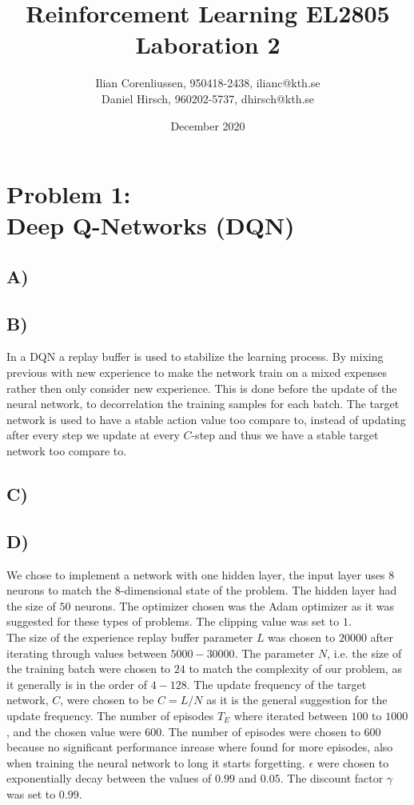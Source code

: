 \documentclass{article}
\title{Reinforcement Learning EL2805\\
       Laboration 2}
\author{Ilian Corenliussen, 950418-2438, ilianc@kth.se\\ 
        Daniel Hirsch, 960202-5737, dhirsch@kth.se}
\date{December 2020}
\begin{document}
\maketitle

\section*{Problem 1: \\
        Deep Q-Networks (DQN)}
\subsection*{A)}

\subsection*{B)} In a DQN a replay buffer is used to stabilize the learning process. By mixing previous with new experience to make the network train on a mixed expenses rather then only consider new experience. This is done before the update of the neural network, to decorrelation the training samples for each batch. The target network is used to have a stable action value too compare to, instead of updating after every step we update at every $C$-step and thus we have a stable target network too compare to.
\subsection*{C)}

\subsection*{D)}
We chose to implement a network with one hidden layer, the input layer uses $8$ neurons to match the 8-dimensional state of the problem. The hidden layer had the size of $50$ neurons. The optimizer chosen was the Adam optimizer as it was suggested for these types of problems. The clipping value was set to $1$.\\
\noindent The size of the experience replay buffer parameter $L$ was chosen to $20000$ after iterating through values between $5000 - 30000$. The parameter $N$, i.e. the size of the training batch were chosen to $24$ to match the complexity of our problem, as it generally is in the order of $4 - 128$.
The update frequency of the target network, $C$, were chosen to be $C = L/N$ as it is the general suggestion for the update frequency. The number of episodes $T_E$ where iterated between $100$ to $1000$, and the chosen value were $600$. The number of episodes were chosen to $600$ because no significant performance inrease where found for more episodes, also when training the neural network to long it starts forgetting. $\epsilon$ were chosen to exponentially decay between the values of $0.99$ and $0.05$. The discount factor $\gamma$ was set to $0.99$. 
\end{document}
